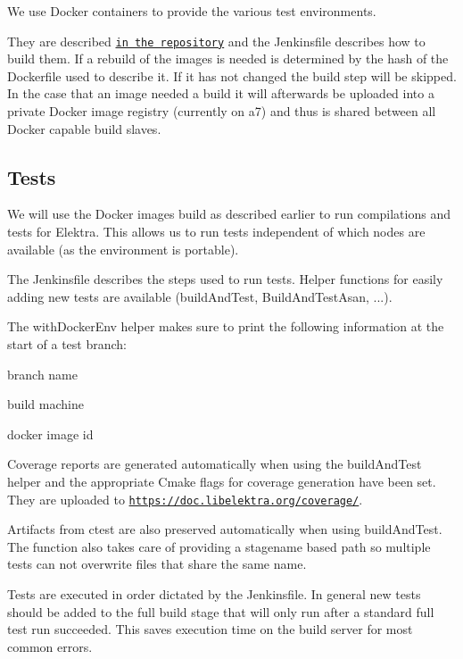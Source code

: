 We use Docker containers to provide the various test environments.

They are described \href{https://master.libelektra.org/scripts/docker}{\tt in the repository} and the Jenkinsfile describes how to build them. If a rebuild of the images is needed is determined by the hash of the Dockerfile used to describe it. If it has not changed the build step will be skipped. In the case that an image needed a build it will afterwards be uploaded into a private Docker image registry (currently on a7) and thus is shared between all Docker capable build slaves.

\subsection*{Tests}

We will use the Docker images build as described earlier to run compilations and tests for Elektra. This allows us to run tests independent of which nodes are available (as the environment is portable).

The Jenkinsfile describes the steps used to run tests. Helper functions for easily adding new tests are available (build\+And\+Test, Build\+And\+Test\+Asan, ...).

The {\ttfamily with\+Docker\+Env} helper makes sure to print the following information at the start of a test branch\+:
\begin{DoxyItemize}
\item branch name
\item build machine
\item docker image id
\end{DoxyItemize}

Coverage reports are generated automatically when using the build\+And\+Test helper and the appropriate Cmake flags for coverage generation have been set. They are uploaded to \href{https://doc.libelektra.org/coverage/}{\tt https\+://doc.\+libelektra.\+org/coverage/}.

Artifacts from {\ttfamily ctest} are also preserved automatically when using build\+And\+Test. The function also takes care of providing a stagename based path so multiple tests can not overwrite files that share the same name.

Tests are executed in order dictated by the Jenkinsfile. In general new tests should be added to the \textquotesingle{}full build stage\textquotesingle{} that will only run after a standard full test run succeeded. This saves execution time on the build server for most common errors.

